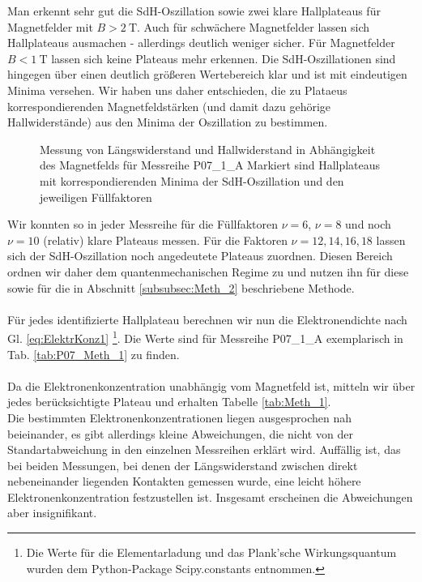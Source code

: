 Man erkennt sehr gut die SdH-Oszillation sowie zwei klare Hallplateaus für Magnetfelder mit $B>\SI{2}{\tesla}$. Auch für schwächere Magnetfelder lassen sich Hallplateaus ausmachen - allerdings deutlich weniger sicher. Für Magnetfelder $B<\SI{1}{\tesla}$ lassen sich keine Plateaus mehr erkennen. Die SdH-Oszillationen sind hingegen über einen deutlich größeren Wertebereich klar und ist mit eindeutigen Minima versehen. Wir haben uns daher entschieden, die zu Plataeus korrespondierenden Magnetfeldstärken (und damit dazu gehörige Hallwiderstände) aus den Minima der Oszillation zu bestimmen.

\begin{figure}[h!]
	\centering
	
    \caption{Messung von Längswiderstand und Hallwiderstand in Abhängigkeit des Magnetfelds für Messreihe P07\_1\_A Markiert sind Hallplateaus mit korrespondierenden Minima der SdH-Oszillation und den jeweiligen Füllfaktoren}
	\label{abb:P07_Meth_1}
\end{figure}

Wir konnten so in jeder Messreihe für die Füllfaktoren $\nu = 6$, $\nu = 8$ und noch $\nu = 10 $ (relativ) klare Plateaus messen. Für die Faktoren $\nu = 12, 14, 16, 18$ lassen sich der SdH-Oszillation noch angedeutete Plateaus zuordnen. Diesen Bereich ordnen wir daher dem quantenmechanischen Regime zu und nutzen ihn für diese sowie für die in Abschnitt \ref{subsubsec:Meth_2} beschriebene Methode. \\
\\
Für jedes identifizierte Hallplateau berechnen wir nun die Elektronendichte nach Gl. \ref{eq:ElektrKonz1} \footnote{Die Werte für die Elementarladung und das Plank'sche Wirkungsquantum wurden dem Python-Package Scipy.constants entnommen.}. Die Werte sind für Messreihe P07\_1\_A exemplarisch in Tab. \ref{tab:P07_Meth_1} zu finden. \\
\\
Da die Elektronenkonzentration unabhängig vom Magnetfeld ist, mitteln wir über jedes berücksichtigte Plateau und erhalten Tabelle \ref{tab:Meth_1}. \\ 

Die bestimmten Elektronenkonzentrationen liegen ausgesprochen nah beieinander, es gibt allerdings kleine Abweichungen, die nicht von der Standartabweichung in den einzelnen Messreihen erklärt wird. Auffällig ist, das bei beiden Messungen, bei denen der Längswiderstand zwischen direkt nebeneinander liegenden Kontakten gemessen wurde, eine leicht höhere Elektronenkonzentration festzustellen ist. Insgesamt erscheinen die Abweichungen aber insignifikant. \\

